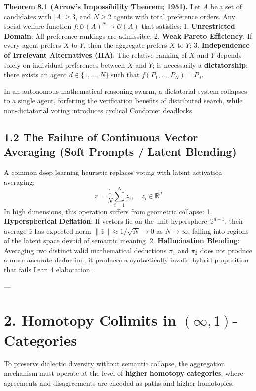 \documentclass[11pt,twoside,openright]{amsbook}
\begin{document}
{{\textbf{Theorem 8.1 (Arrow’s Impossibility Theorem; 1951).} Let $A$ be a set of candidates with $|A| \geq 3$, and $N \geq 2$ agents with total preference orders. Any social welfare function $f: \mathcal{O}(A)^N \to \mathcal{O}(A)$ that satisfies:
1. \textbf{Unrestricted Domain}: All preference rankings are admissible;
2. \textbf{Weak Pareto Efficiency}: If every agent prefers $X$ to $Y$, then the aggregate prefers $X$ to $Y$;
3. \textbf{Independence of Irrelevant Alternatives (IIA)}: The relative ranking of $X$ and $Y$ depends solely on individual preferences between $X$ and $Y$;
is necessarily a \textbf{dictatorship}: there exists an agent $d \in \{1, \dots, N\}$ such that $f(P_1, \dots, P_N) = P_d$.

In an autonomous mathematical reasoning swarm, a dictatorial system collapses to a single agent, forfeiting the verification benefits of distributed search, while non-dictatorial voting introduces cyclical Condorcet deadlocks.

\subsection{1.2 The Failure of Continuous Vector Averaging (Soft Prompts / Latent Blending)}
A common deep learning heuristic replaces voting with latent activation averaging:
$$\bar{z} = \frac{1}{N} \sum_{i=1}^N z_i, \quad z_i \in \mathbb{R}^d$$
In high dimensions, this operation suffers from geometric collapse:
1. \textbf{Hyperspherical Deflation}: If vectors lie on the unit hypersphere $\mathbb{S}^{d-1}$, their average $\bar{z}$ has expected norm $\|\bar{z}\| \approx 1/\sqrt{N} \to 0$ as $N \to \infty$, falling into regions of the latent space devoid of semantic meaning.
2. \textbf{Hallucination Blending}: Averaging two distinct valid mathematical deductions $\pi_1$ and $\pi_2$ does not produce a more accurate deduction; it produces a syntactically invalid hybrid proposition that fails Lean 4 elaboration.

---

\section{2. Homotopy Colimits in $(\infty, 1)$-Categories}

To preserve dialectic diversity without semantic collapse, the aggregation mechanism must operate at the level of \textbf{higher homotopy categories}, where agreements and disagreements are encoded as paths and higher homotopies.

}}
\end{document}
